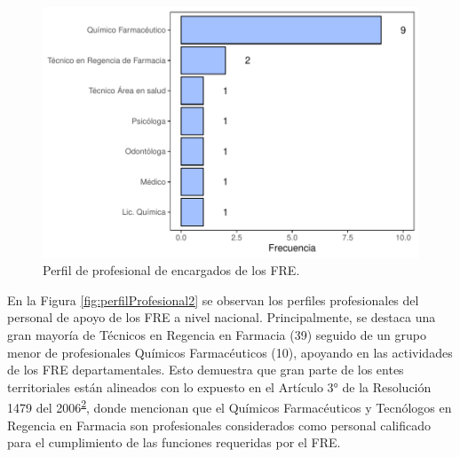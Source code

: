 \documentclass[
]{book}
\begin{document}
\begin{figure}[t!]

{\centering \includegraphics[width=1\linewidth]{InformeFinal_files/figure-latex/perfilProfesionalEncargado-1} 

}

\caption{Perfil de profesional de encargados de los FRE.}\label{fig:perfilProfesionalEncargado}
\end{figure}

En la Figura \ref{fig:perfilProfesional2} se observan los perfiles profesionales del personal de apoyo de los FRE a nivel nacional. Principalmente, se destaca una gran mayoría de Técnicos en Regencia en Farmacia (39) seguido de un grupo menor de profesionales Químicos Farmacéuticos (10), apoyando en las actividades de los FRE departamentales. Esto demuestra que gran parte de los entes territoriales están alineados con lo expuesto en el Artículo 3° de la Resolución 1479 del 2006\textsuperscript{\protect\hyperlink{ref-MSPS1479-2006}{2}}, donde mencionan que el Químicos Farmacéuticos y Tecnólogos en Regencia en Farmacia son profesionales considerados como personal calificado para el cumplimiento de las funciones requeridas por el FRE.
\end{document}
